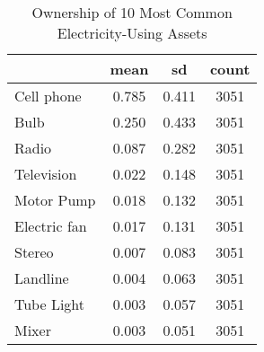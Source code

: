 \begin{table}[htbp]\centering
\def\sym#1{\ifmmode^{#1}\else\(^{#1}\)\fi}
\caption{Ownership of 10 Most Common Electricity-Using Assets \label{tab:"label"}}
\begin{tabular*}{0.9\hsize}{@{\hskip\tabcolsep\extracolsep\fill}l*{1}{ccc}}
\toprule
                                &     mean&       sd&    count\\
\midrule
Cell phone                      &    0.785&    0.411&     3051\\
Bulb                            &    0.250&    0.433&     3051\\
Radio                           &    0.087&    0.282&     3051\\
Television                      &    0.022&    0.148&     3051\\
Motor Pump                      &    0.018&    0.132&     3051\\
Electric fan                    &    0.017&    0.131&     3051\\
Stereo                          &    0.007&    0.083&     3051\\
Landline                        &    0.004&    0.063&     3051\\
Tube Light                      &    0.003&    0.057&     3051\\
Mixer                           &    0.003&    0.051&     3051\\
\bottomrule
\end{tabular*}
\end{table}
